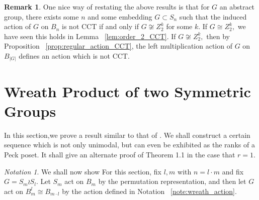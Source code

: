 \documentclass[10 pt]{amsart}
\theoremstyle{plain}
\newtheorem{prop}[thm]{Proposition}
\theoremstyle{definition}
\newtheorem{rem}[thm]{Remark}
\theoremstyle{remark}
\newtheorem{note}[thm]{Notation}
\numberwithin{equation}{section}
\newcommand\BR{{\mathbb R}}
\newcommand\BZ{{\mathbb Z}}
\begin{document}
\begin{rem}
One nice way of restating the above results is that for $G$ an abstract group, there exists some $n$ and some embedding $G \subset S_n$ such that the induced action of $G$ on $B_n$ is not CCT if and only if $G \not \cong Z_2^k$ for some $k.$ If $G\cong Z_2^k,$ we have seen this holds in Lemma ~\ref{lem:order_2_CCT}. If $G \not \cong Z_2^k,$ then by Proposition ~\ref{prop:regular_action_CCT}, the left multiplication action of $G$ on $B_{|G|}$ defines an action which is not CCT.
\end{rem}
\iffalse
\begin{prop}
Let $G$ be the group of linear automorphisms of the cube, embedded in $\BR^n,$ whose vertices are located at the points $(\pm 1, \ldots, \pm 1).$ Then, the action of $G$ on the cube induces an action of $G$ on the $2^n$ vertices of the octahedron, and hence on $B_{2^n}.$ This induced action on $B_{2^n}$ is CCT. 
\end{prop}
\begin{proof}
It is easy to see that the group of linear automorphisms of the cube can be written as the semidirect product $\BZ^n_2 \rtimes S_n.$ The generator of the $i^{th}$ copy of $\BZ_2$ in $\BZ^n_2,$ acts by changing the sign of the $i^{th}$ coordinate, while $S_n$ acts by permuting the coordinates. Using Proposition ~\ref{prop:semidirect_product_preservation}, it suffices to show that the action of $\BZ_2^n$ on $B_{2^n}$ is CCT and the action of $S_n$ on $B_{2^n}/(\BZ_2^n)$ is CCT.

First, by Lemma ~\ref{lem:order_2_CCT}, we know the action of $\BZ_2^n$ on $B_{2^n}$ is CCT. Second, we wish to examine the action of $S_n$ on the quotient poset $B_{2^n}/(\BZ_2^n).$ 
\end{proof}
\fi






\section{Wreath Product of two Symmetric Groups}

In this section,we prove a result similar to that of \cite[Theorem 1.1]{pak}. We shall construct a certain sequence which is not only unimodal, but can even be exhibited as the ranks of a Peck poset. It shall give an alternate proof of Theorem 1.1 in the case that $r = 1.$

\begin{note}
We shall now show 
For this section, fix $l,m$ with $n = l \cdot m$ and fix $G = S_m \wr S_l.$ Let $S_m$ act on $B_m$ by the permutation representation, and then let $G$ act on $B_{m}^l\cong B_{m \cdot l}$ by the action defined in Notation ~\ref{note:wreath_action}.
\end{note}
\end{document}
